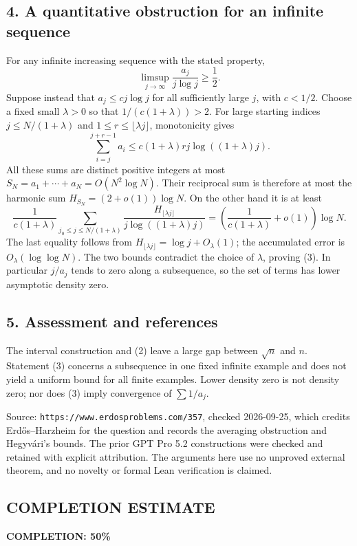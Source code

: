 \subsection*{4. A quantitative obstruction for an infinite sequence}
For any infinite increasing sequence with the stated property,
\[
 \limsup_{j\to\infty}\frac{a_j}{j\log j}\ge\frac12.                  \tag{3}
\]
Suppose instead that $a_j\le c j\log j$ for all sufficiently large
$j$, with $c<1/2$. Choose a fixed small $\lambda>0$ so that
$1/(c(1+\lambda))>2$.
For large starting indices $j\le N/(1+\lambda)$ and
$1\le r\le\lfloor\lambda j\rfloor$, monotonicity gives
\[
 \sum_{i=j}^{j+r-1}a_i
 \le c(1+\lambda)rj\log((1+\lambda)j).
\]
All these sums are distinct positive integers at most
$S_N=a_1+\cdots+a_N=O(N^2\log N)$. Their reciprocal sum is therefore
at most the harmonic sum $H_{S_N}=(2+o(1))\log N$. On the other hand
it is at least
\[
 \frac1{c(1+\lambda)}
 \sum_{j_0\le j\le N/(1+\lambda)}
 \frac{H_{\lfloor\lambda j\rfloor}}{j\log((1+\lambda)j)}
 =\left(\frac1{c(1+\lambda)}+o(1)\right)\log N.
\]
The last equality follows from
$H_{\lfloor\lambda j\rfloor}=\log j+O_\lambda(1)$; the accumulated
error is $O_\lambda(\log\log N)$.
The two bounds contradict the choice of $\lambda$, proving (3).
In particular $j/a_j$ tends to zero along a subsequence, so the
set of terms has lower asymptotic density zero.

\subsection*{5. Assessment and references}
The interval construction and (2) leave a large gap between
$\sqrt n$ and $n$. Statement (3) concerns a subsequence in one fixed
infinite example and does not yield a uniform bound for all finite
examples. Lower density zero is not density zero; nor does (3)
imply convergence of $\sum1/a_j$.

Source: \texttt{https://www.erdosproblems.com/357}, checked 2026-09-25,
which credits Erd\H{o}s--Harzheim for the question and records the
averaging obstruction and Hegyv\'ari's bounds.
The prior GPT Pro 5.2 constructions were checked and retained with
explicit attribution. The arguments here use no unproved external
theorem, and no novelty or formal Lean verification is claimed.
\subsection*{COMPLETION ESTIMATE}
\textbf{COMPLETION: 50\%}
